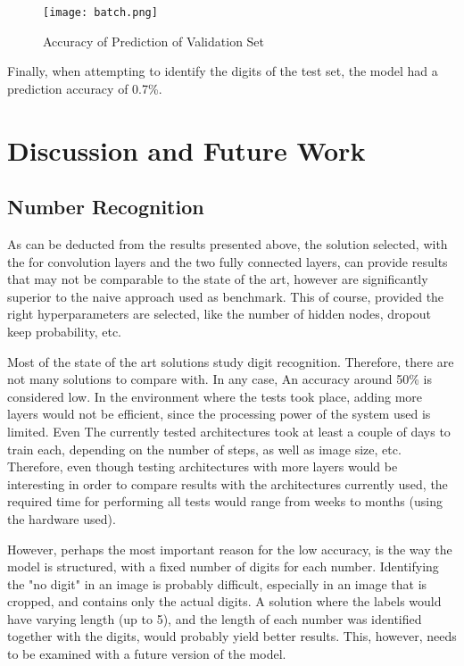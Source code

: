 \documentclass[final,12p,times]{elsarticle}
\begin{document}
\begin{Itemize}
\begin{figure}[H]
  \texttt{[image: batch.png]}
  \caption{Accuracy of Prediction of Validation Set}
  \label{fig:Fig5.4}
  \end{figure}
  
Finally, when attempting to identify the digits of the test set, the model had a prediction accuracy of 0.7\%.





\section{Discussion and Future Work}
\label{sec:6}
\subsection{Number Recognition}
\label{sec:6.1}
As can be deducted from the results presented above, the solution selected, with the for convolution layers and the 
two fully connected layers, can provide results that may not be comparable to the state of the art, however are significantly 
superior to the naive approach used as benchmark.
This of course, provided the right hyperparameters are selected, like the number of hidden nodes, dropout keep probability, etc.

Most of the state of the art solutions study digit recognition.
Therefore, there are not many solutions to compare with.
In any case, An accuracy around 50\% is considered low.
In the environment where the tests took place, adding more layers would not be efficient, since the processing power of the system used is limited.
Even The currently tested architectures took at least a couple of days to train each, depending on the number of steps, as well as image size, etc.
Therefore, even though testing architectures with more layers would be interesting in order to compare results with the 
architectures currently used,  the required time for performing all tests would range from weeks to months 
(using the hardware used).

However, perhaps the most important reason for the low accuracy, is the way the model is structured, with a fixed number of 
digits for each number.
Identifying the "no digit" in an image is probably difficult, especially in an image that is cropped, and contains only the 
actual digits.
A solution where the labels would have varying length (up to 5), and the length of each number was identified together with 
the digits, would probably yield better results.
This, however, needs to be examined with a future version of the model.


\end{Itemize}
\end{document}

